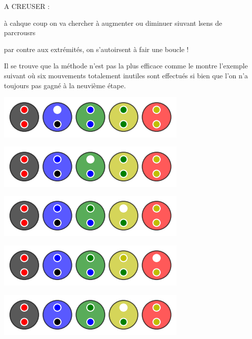 A CREUSER :

	à cahque coup on va chercher à augmenter ou diminuer siuvant lsens de parcrousrs 

	par contre aux extrémités, on s'autoirsent à fair une boucle !



Il se trouve que la méthode  n'est pas la plus efficace comme le montre l'exemple suivant où six mouvements totalement inutiles sont effectués si bien que l'on n'a toujours pas gagné à la neuvième étape.

\vspace{-0.4em}
\begin{multicols}{2}
	\begin{center}   %
		\includegraphics[scale= 0.45]{content/optimal/wheredowego/algo_bubble/000.png}

		\includegraphics[scale= 0.45]{content/optimal/wheredowego/algo_bubble/001.png}

		\includegraphics[scale= 0.45]{content/optimal/wheredowego/algo_bubble/002.png}

		\includegraphics[scale= 0.45]{content/optimal/wheredowego/algo_bubble/003.png}

		\includegraphics[scale= 0.45]{content/optimal/wheredowego/algo_bubble/004.png}
	\end{center}


\end{multicols}
